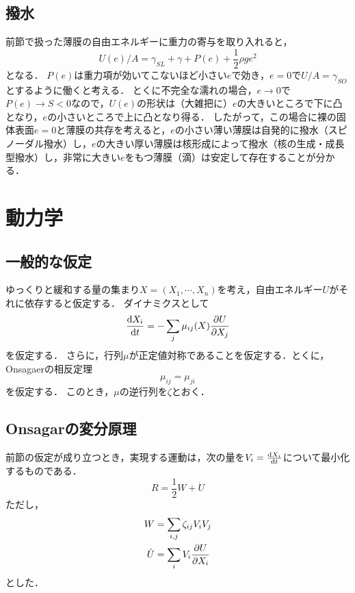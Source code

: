 \documentclass[a4paper,11pt]{jsarticle}
\begin{document}
\subsection{撥水}
前節で扱った薄膜の自由エネルギーに重力の寄与を取り入れると，
\begin{equation}
  U(e)/A = \gamma_{SL} + \gamma + P(e) + \frac{1}{2}\rho g e^2
\end{equation}
となる．
$P(e)$は重力項が効いてこないほど小さい$e$で効き，$e=0$で$U/A=\gamma_{SO}$とするように働くと考える．
とくに不完全な濡れの場合，$e\to 0$で$P(e)\to S < 0$なので，$U(e)$の形状は（大雑把に）$e$の大きいところで下に凸となり，$e$の小さいところで上に凸となり得る．
したがって，この場合に裸の固体表面$e=0$と薄膜の共存を考えると，$e$の小さい薄い薄膜は自発的に撥水（スピノーダル撥水）し，$e$の大きい厚い薄膜は核形成によって撥水（核の生成・成長型撥水）し，非常に大きい$e$をもつ薄膜（滴）は安定して存在することが分かる．

\section{動力学}
\subsection{一般的な仮定}
ゆっくりと緩和する量の集まり$X=(X_1,\cdots,X_n)$を考え，自由エネルギー$U$がそれに依存すると仮定する．
ダイナミクスとして
\begin{equation}
  \dv{X_i}{t} = -\sum_{j} \mu_{ij}(X) \pdv{U}{X_j}
\end{equation}
を仮定する．
さらに，行列$\mu$が正定値対称であることを仮定する．とくに，Onsagaerの相反定理
\begin{equation}
  \mu_{ij} = \mu_{ji}
\end{equation}
を仮定する．
このとき，$\mu$の逆行列を$\zeta$とおく．

\subsection{Onsagarの変分原理}
前節の仮定が成り立つとき，実現する運動は，次の量を$V_i=\dv{X_i}{t}$について最小化するものである．
\begin{equation}
  R = \frac{1}{2}W + \dot{U}
\end{equation}
ただし，
\begin{align}
  W &= \sum_{i,j} \zeta_{ij} V_i V_j \\
  \dot{U} &= \sum_{i} V_i \pdv{U}{X_i}
\end{align}
とした．
\end{document}
